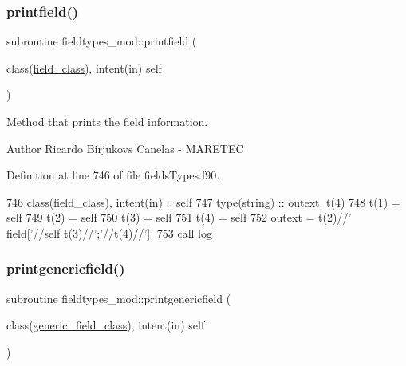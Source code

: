 \subsubsection{\texorpdfstring{printfield()}{printfield()}}
{\footnotesize\ttfamily subroutine fieldtypes\+\_\+mod\+::printfield (\begin{DoxyParamCaption}\item[{class(\mbox{\hyperlink{structfieldtypes__mod_1_1field__class}{field\+\_\+class}}), intent(in)}]{self }\end{DoxyParamCaption})\hspace{0.3cm}{\ttfamily [private]}}



Method that prints the field information. 

\begin{DoxyAuthor}{Author}
Ricardo Birjukovs Canelas -\/ M\+A\+R\+E\+T\+EC 
\end{DoxyAuthor}


Definition at line 746 of file fields\+Types.\+f90.


\begin{DoxyCode}
746     \textcolor{keywordtype}{class}(field\_class), \textcolor{keywordtype}{intent(in)} :: self
747     \textcolor{keywordtype}{type}(string) :: outext, t(4)
748     t(1) = self%
749     t(2) = self%
750     t(3) = self%
751     t(4) = self%
752     outext = t(2)//\textcolor{stringliteral}{' field['}//self%
      t(3)//\textcolor{stringliteral}{';'}//t(4)//\textcolor{stringliteral}{']'}
753     \textcolor{keyword}{call }log%
\end{DoxyCode}
\mbox{\label{namespacefieldtypes__mod_a63d399d72fffde3fe8169b76cce59259}} 
\subsubsection{\texorpdfstring{printgenericfield()}{printgenericfield()}}
{\footnotesize\ttfamily subroutine fieldtypes\+\_\+mod\+::printgenericfield (\begin{DoxyParamCaption}\item[{class(\mbox{\hyperlink{structfieldtypes__mod_1_1generic__field__class}{generic\+\_\+field\+\_\+class}}), intent(in)}]{self }\end{DoxyParamCaption})\hspace{0.3cm}{\ttfamily [private]}}



